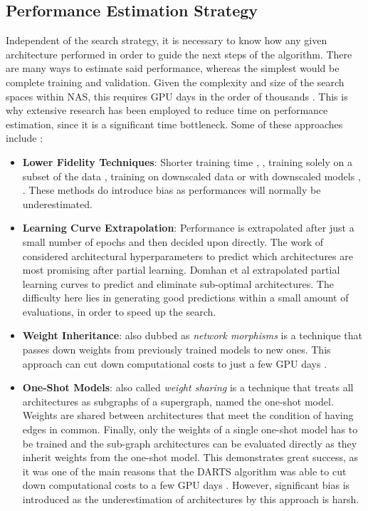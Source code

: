 \documentclass[10pt,        %
               a4paper,     %
               journal,     %
               ]{IEEEtran}
\begin{document}
\subsection{Performance Estimation Strategy}
\label{PES}
Independent of the search strategy, it is necessary to know how any given architecture performed in order
to guide the next steps of the algorithm. There are many ways to estimate said performance, whereas the simplest
would be complete training and validation. Given the complexity and size of the search spaces within NAS, this
requires GPU days in the order of thousands \cite{elsken2019neural}. This is why extensive research has been
employed to reduce time on performance estimation, since it is a significant time bottleneck.
Some of these approaches include \cite{elsken2019neural}:
\begin{itemize}
    \item \textbf{Lower Fidelity Techniques}: Shorter training time \cite{zela2018towards}, \cite{zoph2018learning}, training solely on a
        subset of the data \cite{klein2018towards}, training on downscaled data \cite{chrabaszcz2017downsampled} or with downscaled
        models \cite{zoph2018learning}, \cite{pmlr-v70-real17a}. These methods do introduce bias as performances will normally be
        underestimated.

    \item \textbf{Learning Curve Extrapolation}: Performance is extrapolated after just a small number of epochs and then
        decided upon directly. The work of \cite{klein2018towards} considered architectural hyperparameters to predict which
        architectures are most promising after partial learning. Domhan et al \cite{domhan2015speeding} extrapolated partial
        learning curves to predict and eliminate sub-optimal architectures. The difficulty here lies in generating good
        predictions within a small amount of evaluations, in order to speed up the search.

    \item \textbf{Weight Inheritance}: also dubbed as \textit{network morphisms} is a technique that passes down weights from
        previously trained models to new ones. This approach can cut down computational costs to just a few GPU days
        \cite{cai2018efficient}.

    \item \textbf{One-Shot Models}: also called \textit{weight sharing} is a technique that treats all architectures as subgraphs
        of a supergraph, named the one-shot model. Weights are shared between architectures that meet the condition of
        having edges in common. Finally, only the weights of a single one-shot model has to be trained and the
        sub-graph architectures can be evaluated directly as they inherit weights from the one-shot model. This demonstrates great
        success, as it was one of the main reasons that the DARTS algorithm was able to cut down computational costs
        to a few GPU days \cite{liu2018darts}. However, significant bias is introduced as the underestimation of
        architectures by this approach is harsh.
\end{itemize}
\end{document}

